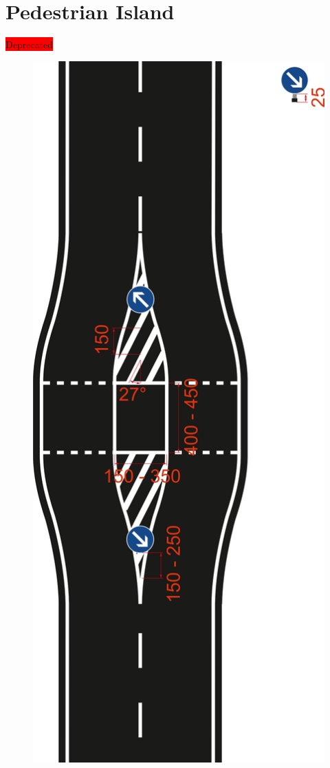 \section{Pedestrian Island}
\colorbox{red}{\large Deprecated}
\begin{figure}[H]
	\begin{center}
		\centering\includegraphics[]{graphics/Abb_10_pedestrian_island.jpg}
	\end{center}
\end{figure}
\newpage


